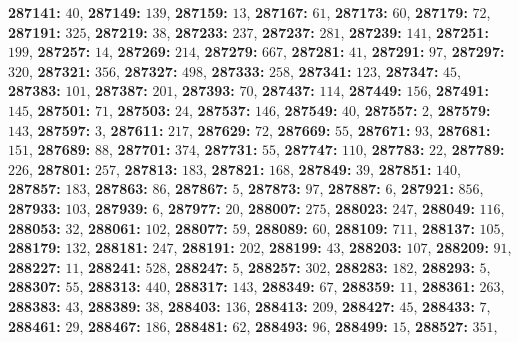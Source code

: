 \textsf{\bfseries 287141:} $40$, \textsf{\bfseries 287149:} $139$, \textsf{\bfseries 287159:} $13$, \textsf{\bfseries 287167:} $61$, \textsf{\bfseries 287173:} $60$, \textsf{\bfseries 287179:} $72$, \textsf{\bfseries 287191:} $325$, \textsf{\bfseries 287219:} $38$, \textsf{\bfseries 287233:} $237$, \textsf{\bfseries 287237:} $281$, \textsf{\bfseries 287239:} $141$, \textsf{\bfseries 287251:} $199$, \textsf{\bfseries 287257:} $14$, \textsf{\bfseries 287269:} $214$, \textsf{\bfseries 287279:} $667$, \textsf{\bfseries 287281:} $41$, \textsf{\bfseries 287291:} $97$, \textsf{\bfseries 287297:} $320$, \textsf{\bfseries 287321:} $356$, \textsf{\bfseries 287327:} $498$, \textsf{\bfseries 287333:} $258$, \textsf{\bfseries 287341:} $123$, \textsf{\bfseries 287347:} $45$, \textsf{\bfseries 287383:} $101$, \textsf{\bfseries 287387:} $201$, \textsf{\bfseries 287393:} $70$, \textsf{\bfseries 287437:} $114$, \textsf{\bfseries 287449:} $156$, \textsf{\bfseries 287491:} $145$, \textsf{\bfseries 287501:} $71$, \textsf{\bfseries 287503:} $24$, \textsf{\bfseries 287537:} $146$, \textsf{\bfseries 287549:} $40$, \textsf{\bfseries 287557:} $2$, \textsf{\bfseries 287579:} $143$, \textsf{\bfseries 287597:} $3$, \textsf{\bfseries 287611:} $217$, \textsf{\bfseries 287629:} $72$, \textsf{\bfseries 287669:} $55$, \textsf{\bfseries 287671:} $93$, \textsf{\bfseries 287681:} $151$, \textsf{\bfseries 287689:} $88$, \textsf{\bfseries 287701:} $374$, \textsf{\bfseries 287731:} $55$, \textsf{\bfseries 287747:} $110$, \textsf{\bfseries 287783:} $22$, \textsf{\bfseries 287789:} $226$, \textsf{\bfseries 287801:} $257$, \textsf{\bfseries 287813:} $183$, \textsf{\bfseries 287821:} $168$, \textsf{\bfseries 287849:} $39$, \textsf{\bfseries 287851:} $140$, \textsf{\bfseries 287857:} $183$, \textsf{\bfseries 287863:} $86$, \textsf{\bfseries 287867:} $5$, \textsf{\bfseries 287873:} $97$, \textsf{\bfseries 287887:} $6$, \textsf{\bfseries 287921:} $856$, \textsf{\bfseries 287933:} $103$, \textsf{\bfseries 287939:} $6$, \textsf{\bfseries 287977:} $20$, \textsf{\bfseries 288007:} $275$, \textsf{\bfseries 288023:} $247$, \textsf{\bfseries 288049:} $116$, \textsf{\bfseries 288053:} $32$, \textsf{\bfseries 288061:} $102$, \textsf{\bfseries 288077:} $59$, \textsf{\bfseries 288089:} $60$, \textsf{\bfseries 288109:} $711$, \textsf{\bfseries 288137:} $105$, \textsf{\bfseries 288179:} $132$, \textsf{\bfseries 288181:} $247$, \textsf{\bfseries 288191:} $202$, \textsf{\bfseries 288199:} $43$, \textsf{\bfseries 288203:} $107$, \textsf{\bfseries 288209:} $91$, \textsf{\bfseries 288227:} $11$, \textsf{\bfseries 288241:} $528$, \textsf{\bfseries 288247:} $5$, \textsf{\bfseries 288257:} $302$, \textsf{\bfseries 288283:} $182$, \textsf{\bfseries 288293:} $5$, \textsf{\bfseries 288307:} $55$, \textsf{\bfseries 288313:} $440$, \textsf{\bfseries 288317:} $143$, \textsf{\bfseries 288349:} $67$, \textsf{\bfseries 288359:} $11$, \textsf{\bfseries 288361:} $263$, \textsf{\bfseries 288383:} $43$, \textsf{\bfseries 288389:} $38$, \textsf{\bfseries 288403:} $136$, \textsf{\bfseries 288413:} $209$, \textsf{\bfseries 288427:} $45$, \textsf{\bfseries 288433:} $7$, \textsf{\bfseries 288461:} $29$, \textsf{\bfseries 288467:} $186$, \textsf{\bfseries 288481:} $62$, \textsf{\bfseries 288493:} $96$, \textsf{\bfseries 288499:} $15$, \textsf{\bfseries 288527:} $351$, 
